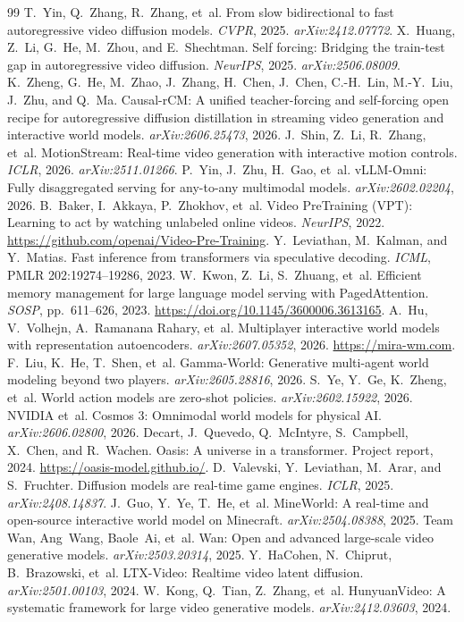 \documentclass[11pt]{article}
\begin{document}
\begin{thebibliography}{99}
 T.~Yin, Q.~Zhang, R.~Zhang, et~al. From slow bidirectional to fast autoregressive video diffusion models. \emph{CVPR}, 2025. \emph{arXiv:2412.07772}.
 X.~Huang, Z.~Li, G.~He, M.~Zhou, and E.~Shechtman. Self forcing: Bridging the train-test gap in autoregressive video diffusion. \emph{NeurIPS}, 2025. \emph{arXiv:2506.08009}.
 K.~Zheng, G.~He, M.~Zhao, J.~Zhang, H.~Chen, J.~Chen, C.-H.~Lin, M.-Y.~Liu, J.~Zhu, and Q.~Ma. Causal-rCM: A unified teacher-forcing and self-forcing open recipe for autoregressive diffusion distillation in streaming video generation and interactive world models. \emph{arXiv:2606.25473}, 2026.
 J.~Shin, Z.~Li, R.~Zhang, et~al. MotionStream: Real-time video generation with interactive motion controls. \emph{ICLR}, 2026. \emph{arXiv:2511.01266}.
 P.~Yin, J.~Zhu, H.~Gao, et~al. vLLM-Omni: Fully disaggregated serving for any-to-any multimodal models. \emph{arXiv:2602.02204}, 2026.
 B.~Baker, I.~Akkaya, P.~Zhokhov, et~al. Video PreTraining (VPT): Learning to act by watching unlabeled online videos. \emph{NeurIPS}, 2022. \url{https://github.com/openai/Video-Pre-Training}.
 Y.~Leviathan, M.~Kalman, and Y.~Matias. Fast inference from transformers via speculative decoding. \emph{ICML}, PMLR 202:19274--19286, 2023.
 W.~Kwon, Z.~Li, S.~Zhuang, et~al. Efficient memory management for large language model serving with PagedAttention. \emph{SOSP}, pp.~611--626, 2023. \url{https://doi.org/10.1145/3600006.3613165}.
 A.~Hu, V.~Volhejn, A.~Ramanana Rahary, et~al. Multiplayer interactive world models with representation autoencoders. \emph{arXiv:2607.05352}, 2026. \url{https://mira-wm.com}.
 F.~Liu, K.~He, T.~Shen, et~al. Gamma-World: Generative multi-agent world modeling beyond two players. \emph{arXiv:2605.28816}, 2026.
 S.~Ye, Y.~Ge, K.~Zheng, et~al. World action models are zero-shot policies. \emph{arXiv:2602.15922}, 2026.
 NVIDIA et~al. Cosmos 3: Omnimodal world models for physical AI. \emph{arXiv:2606.02800}, 2026.
 Decart, J.~Quevedo, Q.~McIntyre, S.~Campbell, X.~Chen, and R.~Wachen. Oasis: A universe in a transformer. Project report, 2024. \url{https://oasis-model.github.io/}.
 D.~Valevski, Y.~Leviathan, M.~Arar, and S.~Fruchter. Diffusion models are real-time game engines. \emph{ICLR}, 2025. \emph{arXiv:2408.14837}.
 J.~Guo, Y.~Ye, T.~He, et~al. MineWorld: A real-time and open-source interactive world model on Minecraft. \emph{arXiv:2504.08388}, 2025.
 Team Wan, Ang~Wang, Baole~Ai, et~al. Wan: Open and advanced large-scale video generative models. \emph{arXiv:2503.20314}, 2025.
 Y.~HaCohen, N.~Chiprut, B.~Brazowski, et~al. LTX-Video: Realtime video latent diffusion. \emph{arXiv:2501.00103}, 2024.
 W.~Kong, Q.~Tian, Z.~Zhang, et~al. HunyuanVideo: A systematic framework for large video generative models. \emph{arXiv:2412.03603}, 2024.
\end{thebibliography}
\end{document}
